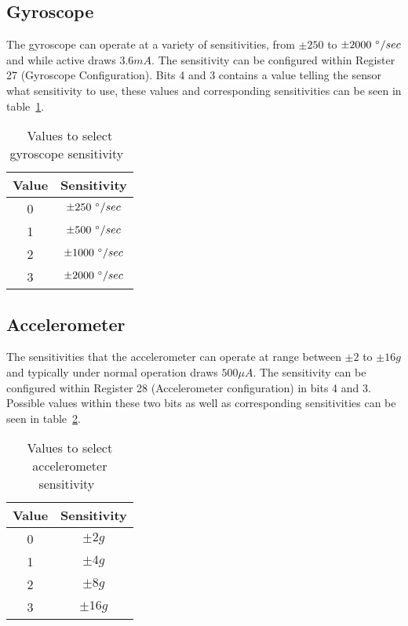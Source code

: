 \subsection{Gyroscope}

The gyroscope can operate at a variety of sensitivities, from $\pm 250$ to $\pm 2000~\degree / sec$ and while active draws $3.6mA$. The sensitivity can be configured within Register 27 (Gyroscope Configuration). Bits 4 and 3 contains a value telling the sensor what sensitivity to use, these values and corresponding sensitivities can be seen in table~\ref{tab:gyro:range}. \cite{sensor_registers}

\begin{table}
	\centering
	\begin{tabular}{|c|c|}
		\hline
		Value & Sensitivity \\
		\hline
		0 & $\pm 250~\degree / sec$ \\
		1 & $\pm 500~\degree / sec$ \\
		2 & $\pm 1000~\degree / sec$ \\
		3 & $\pm 2000~\degree / sec$ \\
		\hline
	\end{tabular}
	\caption{Values to select gyroscope sensitivity~\cite{sensor_registers}}
	\label{tab:gyro:range}
\end{table}

\subsection{Accelerometer}

The sensitivities that the accelerometer can operate at range between $\pm 2$ to $\pm 16g$ and typically under normal operation draws $500\mu A$. The sensitivity can be configured within Register 28 (Accelerometer configuration) in bits 4 and 3. Possible values within these two bits as well as corresponding sensitivities can be seen in table~\ref{tab:accel:range}. \cite{sensor_registers}

\begin{table}
	\centering
	\begin{tabular}{|c|c|}
		\hline
		Value & Sensitivity \\
		\hline
		0 & $\pm 2g$ \\
		1 & $\pm 4g$ \\
		2 & $\pm 8g$ \\
		3 & $\pm 16g$ \\
		\hline
	\end{tabular}
	\caption{Values to select accelerometer sensitivity~\cite{sensor_registers}}
	\label{tab:accel:range}
\end{table}

